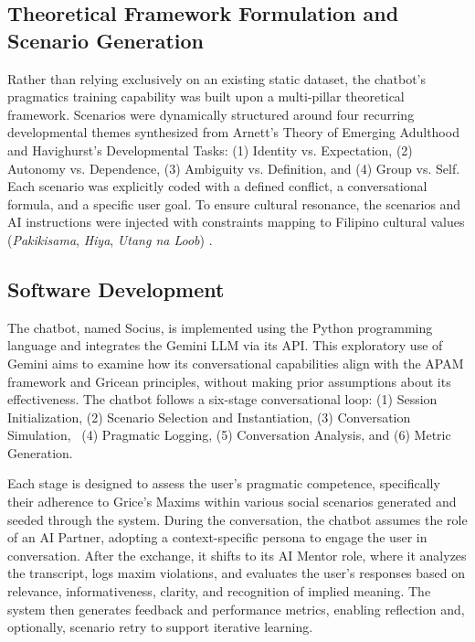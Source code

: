 \subsection {Theoretical Framework Formulation and Scenario Generation}
\indent Rather than relying exclusively on an existing static dataset, the chatbot's pragmatics training capability was built upon a multi-pillar theoretical framework. 
Scenarios were dynamically structured around four recurring developmental themes synthesized from Arnett's Theory of Emerging Adulthood and Havighurst's Developmental Tasks: 
(1) Identity vs. Expectation, (2) Autonomy vs. Dependence, (3) Ambiguity vs. Definition, and (4) Group vs. Self. Each scenario was explicitly coded with a defined conflict, 
a conversational formula, and a specific user goal. To ensure cultural resonance, the scenarios and AI instructions were injected with constraints mapping to 
Filipino cultural values (\textit{Pakikisama}, \textit{Hiya}, \textit{Utang na Loob}) \cite{jocano_filipino_1997}.

\subsection{Software Development}
\indent The chatbot, named Socius, is implemented using the Python programming language and integrates the Gemini LLM via its API. 
This exploratory use of Gemini aims to examine how its conversational capabilities align with the APAM framework and Gricean principles, without making prior assumptions about 
its effectiveness. The chatbot follows a six-stage conversational loop: (1) Session Initialization, (2) Scenario Selection and Instantiation, (3) Conversation Simulation, \
(4) Pragmatic Logging, (5) Conversation Analysis, and (6) Metric Generation.

Each stage is designed to assess the user’s pragmatic competence, specifically their adherence to Grice’s Maxims within various social scenarios generated and seeded through 
the system. During the conversation, the chatbot assumes the role of an AI Partner, adopting a context-specific persona to engage the user in conversation. After the exchange, it shifts 
to its AI Mentor role, where it analyzes the transcript, logs maxim violations, and evaluates the user’s responses based on relevance, informativeness, clarity, and recognition of 
implied meaning. The system then generates feedback and performance metrics, enabling reflection and, optionally, scenario retry to support iterative learning.

